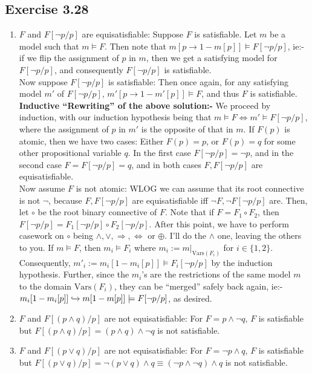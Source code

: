 \documentclass{article}
\newcommand{\Vars}{\mathrm{Vars}}
\begin{document}
\subsection*{Exercise 3.28}
\begin{enumerate}[label=(\alph*)]
    \item $F$ and $F[\lnot p/p]$ are equisatisfiable: Suppose $F$ is satisfiable. Let $m$ be a model such that $m\models F$. Then note that $m[p\rightarrow 1-m[p]]\models F[\lnot p/p]$, ie:- if we flip the assignment of $p$ in $m$, then we get a satisfying model for $F[\lnot p/p]$, and consequently $F[\lnot p/p]$ is satisfiable.\\
    Now suppose $F[\lnot p/p]$ is satisfiable: Then once again, for any satisfying model $m'$ of $F[\lnot p/p]$, $m'[p\rightarrow 1-m'[p]]\models F$, and thus $F$ is satisfiable.\\
    \textbf{Inductive ``Rewriting'' of the above solution:-} We proceed by induction, with our induction hypothesis being that $m\models F\Longleftrightarrow m'\models F[\lnot p/p]$, where the assignment of $p$ in $m'$ is the opposite of that in $m$. If $F(p)$ is atomic, then we have two cases: Either $F(p) = p$, or $F(p) = q$ for some other propositional variable $q$. In the first case $F[\lnot p/p] = \lnot p$, and in the second case $F = F[\lnot p/p] = q$, and in both cases $F, F[\lnot p/p]$ are equisatisfiable. \\
    Now assume $F$ is not atomic: WLOG we can assume that its root connective is not $\lnot$, because $F, F[\lnot p/p]$ are equisatisfiable iff $\lnot F, \lnot F[\lnot p/p]$ are. Then, let $\circ$ be the root binary connective of $F$. Note that if $F = F_1\circ F_2$, then $F[\lnot p/p] = F_1[\lnot p/p]\circ F_2[\lnot p/p]$. After this point, we have to perform casework on $\circ$ being $\wedge, \lor, \Rightarrow, \Leftrightarrow$ or $\oplus$. I'll do the $\wedge$ one, leaving the others to you. If $m\models F$, then $m_i\models F_i$ where $m_i:= m|_{\Vars(F_i)}$ for $i\in\{1, 2\}$. Consequently, $m'_i:= m_i[1-m_i[p]]\models F_i[\lnot p/p]$ by the induction hypothesis. Further, since the $m_i$'s are the restrictions of the same model $m$ to the domain $\Vars(F_i)$, they can be ``merged'' safely back again, ie:- $m_i[1-m_i[p]]\xhookrightarrow{} m[1-m[p]]\models F[\lnot p/p]$, as desired.
    \item $F$ and $F[(p\wedge q)/p]$ are not equisatisfiable: For $F = p\wedge\lnot q$, $F$ is satisfiable but $F[(p\wedge q)/p] = (p\wedge q)\wedge\lnot q$ is not satisfiable.
    \item $F$ and $F[(p\lor q)/p]$ are not equisatisfiable: For $F = \lnot p\wedge q$, $F$ is satisfiable but $F[(p\lor q)/p] = \lnot(p\lor q)\wedge q\equiv (\lnot p\wedge\lnot q)\wedge q$ is not satisfiable.
\end{enumerate}
\end{document}
